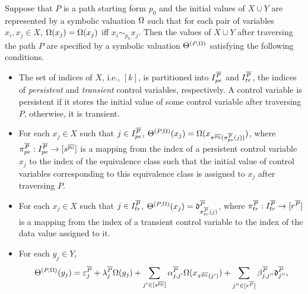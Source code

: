 \begin{proposition}\label{prop-sum-path}
Suppose that $P$ is a path starting form $p_0$ and the initial values of $X \cup Y$ are represented by a symbolic valuation $\Omega$ such that for each pair of variables $x_i, x_j \in X$, $\Omega(x_j)=\Omega(x_j)$ iff $x_i \sim_{p_0} x_j$. Then the values of $X \cup Y$ after traversing the path $P$ are specified by a symbolic valuation $\Theta^{(P,\Omega)}$ satisfying the following conditions.
\begin{itemize}
\item The set of indices of $X$, i.e., $[k]$, is partitioned into $I^{\overline{P}}_{pe}$ and $I^{\overline{P}}_{tr}$, the indices of \emph{persistent} and \emph{transient} control variables, respectively. A control variable is persistent if it stores the initial value of some control variable after traversing $P$, otherwise, it is transient.
\item For each $x_j\in X$ such that $j \in I^{\overline{P}}_{pe}$, $\Theta^{(P,\Omega)}(x_j)=\Omega(x_{\pi^{\overline{p_0}}(\pi^{\overline{P}}_{pe}(j))})$, where $\pi^{\overline{P}}_{pe}: I^{\overline{P}}_{pe} \rightarrow [s^{\overline{p_0}}]$ is a mapping from the index of a persistent control variable $x_j$ to the index of the equivalence class such that the initial value of control variables corresponding to this equivalence class is assigned to $x_j$ after traversing $P$.
%
\item  For each $x_j\in X$ such that $j\in I^{\overline{P}}_{tr}$,
$\Theta^{(P,\Omega)}(x_j)=\mathfrak{d}^{\overline{P}}_{\pi^{\overline{P}}_{tr}(j)}$, where $\pi^{\overline{P}}_{tr}: I^{\overline{P}}_{tr} \rightarrow [r^{\overline{P}}]$ is a mapping from the index of a transient control variable to the index of the data value assigned to it.
% 
\item For each $y_j \in Y$, 
\[
 \Theta^{(P,\Omega)}(y_j)  =
 \varepsilon^{\overline{P}}_{j} + 
 \lambda^{\overline{P}}_j \Omega(y_j)  + 
  \sum\limits_{j'\in [s^{\overline{p_0}}]} \alpha^{\overline{P}}_{j,j'}\Omega(x_{\pi^{\overline{p_0}}(j')}) +
  \sum\limits_{j''\in [r^{\overline{P}}]}\beta^{\overline{P}}_{j,j''} \mathfrak{d}^{\overline{P}}_{j''},
\]  
\end{itemize}
\end{proposition}
